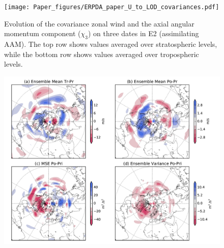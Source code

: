  \begin{figure}
	 \texttt{[image: Paper\_figures/ERPDA\_paper\_U\_to\_LOD\_covariances.pdf]}
	 \caption{Evolution of the covariance zonal wind and the axial angular momentum component ($\chi_3$) on three dates in E2 (assimilating AAM). The top row shows values averaged over stratospheric levels, while the bottom row shows values averaged over tropospheric levels.}
 \label{fig:covariances}
\end{figure}

 \begin{figure}
	 \includegraphics[width=\textwidth]{Paper_figures/ERPDA_paper_U_priorerror_vs_increment_vs_ER_31jan.pdf}
	 \caption{}
 \label{fig:error_increments}
\end{figure}


